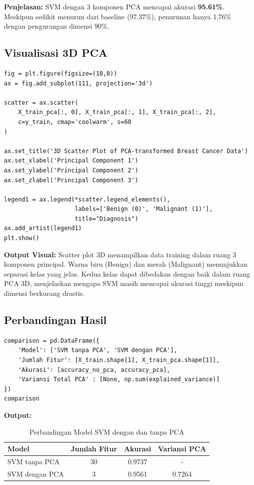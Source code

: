 \documentclass[12pt,a4paper]{article}
\begin{document}
\textbf{Penjelasan:} SVM dengan 3 komponen PCA mencapai akurasi \textbf{95.61\%}. Meskipun sedikit menurun dari baseline (97.37\%), penurunan hanya 1.76\% dengan pengurangan dimensi 90\%.

\subsection{Visualisasi 3D PCA}

\begin{lstlisting}[caption=3D Scatter Plot Data PCA]
fig = plt.figure(figsize=(10,8))
ax = fig.add_subplot(111, projection='3d')

scatter = ax.scatter(
    X_train_pca[:, 0], X_train_pca[:, 1], X_train_pca[:, 2], 
    c=y_train, cmap='coolwarm', s=60
)

ax.set_title('3D Scatter Plot of PCA-transformed Breast Cancer Data')
ax.set_xlabel('Principal Component 1')
ax.set_ylabel('Principal Component 2')
ax.set_zlabel('Principal Component 3')

legend1 = ax.legend(*scatter.legend_elements(), 
                    labels=['Benign (0)', 'Malignant (1)'], 
                    title="Diagnosis")
ax.add_artist(legend1)
plt.show()
\end{lstlisting}

\textbf{Output Visual:} Scatter plot 3D menampilkan data training dalam ruang 3 komponen principal. Warna biru (Benign) dan merah (Malignant) menunjukkan separasi kelas yang jelas. Kedua kelas dapat dibedakan dengan baik dalam ruang PCA 3D, menjelaskan mengapa SVM masih mencapai akurasi tinggi meskipun dimensi berkurang drastis.

\subsection{Perbandingan Hasil}

\begin{lstlisting}[caption=Tabel Perbandingan]
comparison = pd.DataFrame({
    'Model': ['SVM tanpa PCA', 'SVM dengan PCA'],
    'Jumlah Fitur': [X_train.shape[1], X_train_pca.shape[1]],
    'Akurasi': [accuracy_no_pca, accuracy_pca],
    'Variansi Total PCA' : [None, np.sum(explained_variance)]
})
comparison
\end{lstlisting}

\textbf{Output:}
\begin{table}[H]
\centering
\caption{Perbandingan Model SVM dengan dan tanpa PCA}
\begin{tabular}{|l|c|c|c|}
\hline
\textbf{Model} & \textbf{Jumlah Fitur} & \textbf{Akurasi} & \textbf{Variansi PCA} \\
\hline
SVM tanpa PCA & 30 & 0.9737 & - \\
SVM dengan PCA & 3 & 0.9561 & 0.7264 \\
\hline
\end{tabular}
\end{table}
\end{document}

